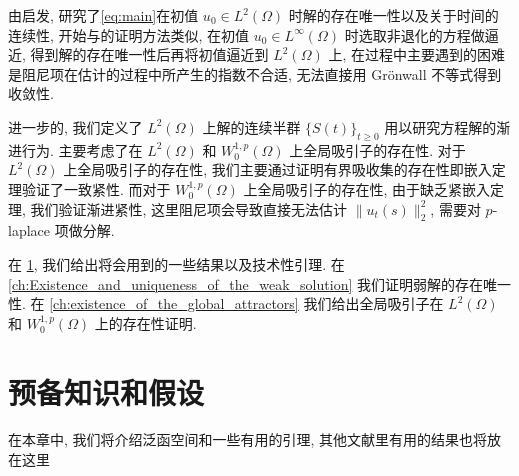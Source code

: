 \documentclass[oneside,longtitle]{LZUthesis}
\theoremstyle{definition}
\numberwithin{equation}{chapter}
\newcommand*\norm[1]{\lVert#1\rVert}
\newcommand*\Brace[1]{\lbrace#1\rbrace}
\begin{document}
由\citep{Zhan2019Uniquenessa}启发, 研究了\cref{eq:main}在初值 $u_0 \in L^2(\Omega)$ 时解的存在唯一性以及关于时间的连续性,
开始与\citep{Zhan2019Uniquenessa}的证明方法类似, 在初值 $u_0 \in L^\infty(\Omega)$ 时选取非退化的方程做逼近,
得到解的存在唯一性后再将初值逼近到 $L^2(\Omega)$ 上, 在过程中主要遇到的困难是阻尼项在估计的过程中所产生的指数不合适,
无法直接用 Gr\"onwall 不等式得到收敛性.

进一步的, 我们定义了 $L^2(\Omega) $ 上解的连续半群 $\Brace{S(t)}_{t \geq 0} $ 用以研究方程解的渐进行为.
主要考虑了在 $L^2(\Omega)$ 和 $W_0^{1, p}(\Omega)$ 上全局吸引子的存在性.
对于 $L^2(\Omega)$ 上全局吸引子的存在性,
我们主要通过证明有界吸收集的存在性即嵌入定理验证了一致紧性.
而对于 $W_0^{1, p}(\Omega)$ 上全局吸引子的存在性,
由于缺乏紧嵌入定理, 我们验证渐进紧性, 这里阻尼项会导致直接无法估计
$\norm{u_t(s)}_2^2$, 需要对 $p$-laplace 项做分解.

在 \cref{ch:preliminaries},
我们给出将会用到的一些结果以及技术性引理. 在
\cref{ch:Existence_and_uniqueness_of_the_weak_solution}
我们证明弱解的存在唯一性.
在 \cref{ch:existence_of_the_global_attractors}
我们给出全局吸引子在
$L^2(\Omega)$ 和 $W_0^{1,p}(\Omega)$ 上的存在性证明.

\chapter{预备知识和假设}\label{ch:preliminaries}
在本章中, 我们将介绍泛函空间和一些有用的引理,
其他文献里有用的结果也将放在这里
\end{document}
